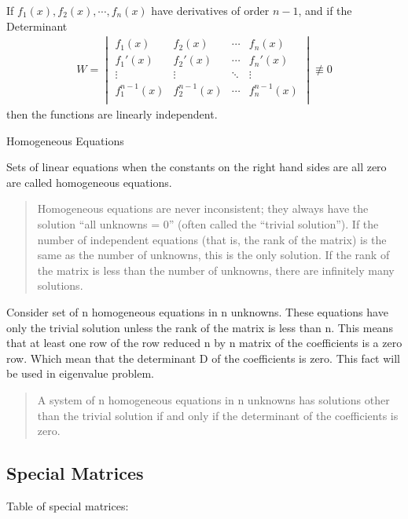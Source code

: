 \documentclass[../main.tex]{subfiles}
\begin{document}
If $f_1(x), f_2(x),\cdots, f_n(x)$ have derivatives of order $n - 1$, and if the Determinant
\begin{align*}
    W=\begin{vmatrix}
        f_1(x)& f_2(x)&\cdots& f_n(x)\\
        f_1'(x)& f_2'(x)&\cdots& f_n'(x)\\
        \vdots&\vdots&\ddots& \vdots\\
        f_1^{n-1}(x)& f_2^{n-1}(x)&\cdots& f_n^{n-1}(x)\\
    \end{vmatrix}\not\equiv0
\end{align*}then the functions are linearly independent.

Homogeneous Equations
\begin{definition}
    Sets of linear equations when the constants on the right hand sides are all zero are called homogeneous equations.
\end{definition}
\begin{quotation}
    Homogeneous equations are never inconsistent; they always have the solution “all unknowns = 0” (often called the “trivial solution”). 
If the number of independent equations (that is, the rank of the matrix) is the same as the number of unknowns, this is the only solution. 
If the rank of the matrix is less than the number of unknowns, there are infinitely many solutions.
\end{quotation}
Consider set of n homogeneous equations in n unknowns.
These equations have only the trivial solution unless the rank of the matrix is less than n. 
This means that at least one row of the row reduced n by n matrix of the coefficients is a zero row. 
Which mean that the determinant D of the coefficients is zero.
This fact will be used in eigenvalue problem.
\begin{quote}
    A system of n homogeneous equations in n unknowns has solutions
other than the trivial solution if and only if the determinant of the
coefficients is zero.
\end{quote}


\subsection*{Special Matrices}
Table of special matrices:
\end{document}
